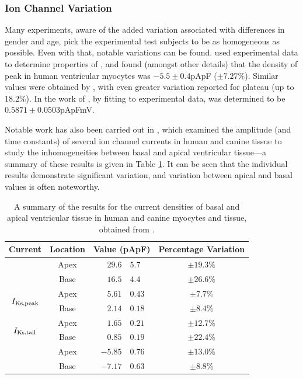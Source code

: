 \documentclass[../thesis-main.tex]{subfiles}
\begin{document}
 \subsubsection{Ion Channel Variation}
 \label{subsubsec:ionChannel-variation}
 Many experiments, aware of the added variation associated with differences in gender and age, pick the experimental test subjects to be as homogeneous as possible. Even with that, notable variations can be found. \citet{Fulop2004} used experimental data to determine properties of \ica{}, and found (amongst other details) that the density of peak \ica{} in human ventricular myocytes was $-5.5\pm0.4$pApF ($\pm7.27\%$). Similar values were obtained by \citet{Li1999}, with even greater variation reported for plateau \ica{} (up to $18.2\%$). In the work of \citet{Fink2008}, by fitting to experimental data, \gkix{} was determined to be $0.5871\pm0.0503$pApFmV.
 
 Notable work has also been carried out in \citet{Szentadrassy2005}, which examined the amplitude (and time constants) of several ion channel currents in human and canine tissue to study the inhomogeneities between basal and apical ventricular tissue---a summary of these results is given in Table \ref{table:szentadrassy-results}. It can be seen that the individual results demonstrate significant variation, and variation between apical and basal values is often noteworthy.
 \begin{table}
  \centering
  \begin{tabular}{ccr@{$\pm$}lc}
   Current					& Location	& \multicolumn{2}{c}{Value (pApF\super{-1})}	& Percentage Variation	\\
   \hline
   \hline
   \multirow{2}{*}{\ito{}}			& Apex		& $29.6$&$5.7$					& $\pm19.3\%$		\\
						& Base		& $16.5$&$4.4$					& $\pm26.6\%$		\\
   \hline
   \multirow{2}{*}{$I_\textnormal{Ks,peak}$}	& Apex		& $5.61$&$0.43$					& $\pm7.7\%$		\\
						& Base		& $2.14$&$0.18$					& $\pm8.4\%$		\\
   \multirow{2}{*}{$I_\textnormal{Ks,tail}$}	& Apex		& $1.65$&$0.21$					& $\pm12.7\%$		\\
						& Base		& $0.85$&$0.19$					& $\pm22.4\%$		\\
   \hline
   \multirow{2}{*}{\ica{}}			& Apex		& $-5.85$&$0.76$				& $\pm13.0\%$		\\
						& Base		& $-7.17$&$0.63$				& $\pm8.8\%$		\\
  \end{tabular}
  \caption[Summary of current density results from \citet{Szentadrassy2005}.]{A summary of the results for the current densities of basal and apical ventricular tissue in human and canine myocytes and tissue, obtained from \citet{Szentadrassy2005}.}
  \label{table:szentadrassy-results}
 \end{table}
 
\end{document}
